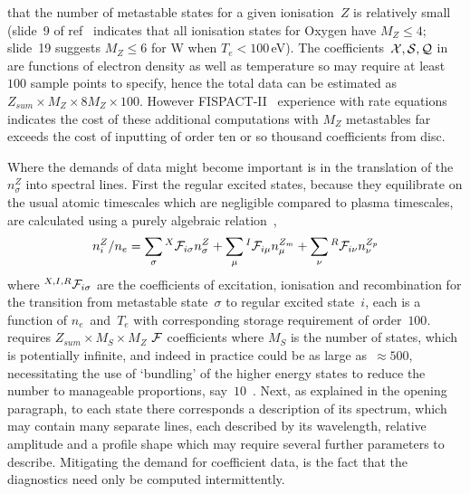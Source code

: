 that the number of metastable states
for a given ionisation~$Z$ is relatively small (slide~9 of ref~\cite{Su06ADAS} indicates that all ionisation
states for Oxygen have $M_Z \leq 4$; slide~19 suggests $M_Z\leq6$ for W when $T_e<100$\,eV).
The coefficients~$\mathcal{X}, \mathcal{S}, \mathcal{Q}$ in  are functions of electron density as well
as temperature so may require at least~$100$ sample points to specify, hence the total data can be estimated
as~$Z_{sum}\times M_Z\times 8M_Z\times 100$.
However FISPACT-II~\cite{Su17FISP} experience with rate equations indicates the cost of 
these additional computations with $M_Z$ metastables far exceeds
the cost of inputting of order ten or so thousand coefficients from disc.

Where the demands of data might become important is in the translation of the $n^Z_\sigma$ into
spectral lines. First the regular excited states, because they equilibrate on the usual
atomic timescales which are negligible compared to plasma timescales, are calculated 
using a purely algebraic relation~\cite[eq.\ (5)]{Ba03Diel},
\begin{equation} \label{eq:niz}
n_i^Z/n_e = \sum_\sigma {^X\mathcal{F}_{i\sigma}} n^Z_\sigma
+ \sum_\mu {^I\mathcal{F}_{i\mu}} n^{Z_m}_\mu
+ \sum_\nu {^R\mathcal{F}_{i\nu}} n^{Z_p}_\nu
\end{equation}
where $^{X,I,R}\mathcal{F}_{i\sigma}$ are the coefficients of excitation, ionisation and recombination
for the transition from metastable state~$\sigma$ to regular excited state~$i$, each is a function
of $n_e$~and~$T_e$ with corresponding storage requirement of order~$100$.
  requires $Z_{sum} \times M_S \times M_Z$ $\mathcal{F}$ coefficients where $M_S$ is the number of states,
which is potentially infinite, and indeed in practice could be as large as~$\approx 500$,
necessitating the use of `bundling' of the higher energy states to reduce the number to manageable
proportions, say~$10$~\cite {Ba03Diel}.
Next, as explained in the opening paragraph, to each state there corresponds a description of
its spectrum, which may contain
many separate lines, each described by its wavelength, relative amplitude and
a profile shape which may require several further parameters to describe.
Mitigating the demand for coefficient data, is the fact that the diagnostics need only be
computed intermittently.


